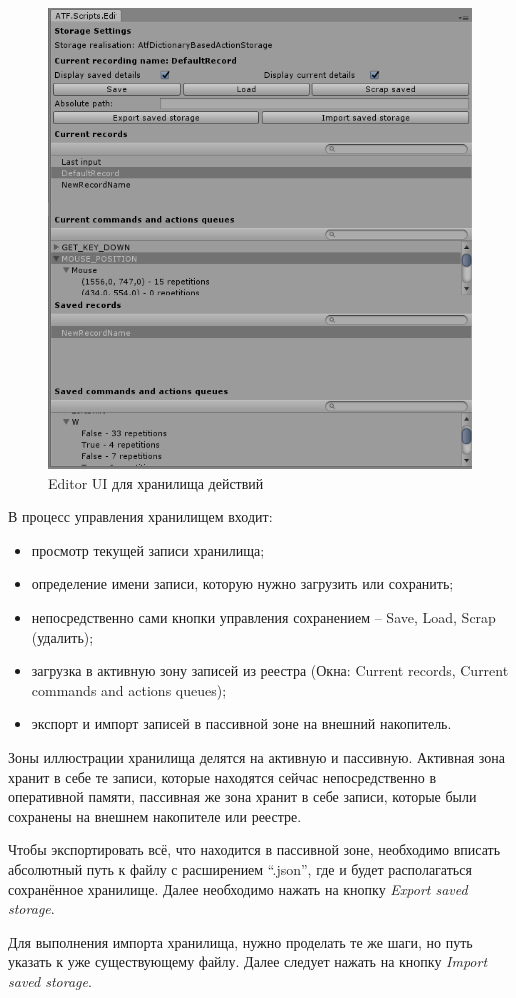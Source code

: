 \begin{figure}[h]
	\centering
	\includegraphics[width=0.7\linewidth]{storage.PNG}
	\caption{Editor UI для хранилища действий}
	\label{storageUI}
\end{figure}

В процесс управления хранилищем входит:
\begin{itemize}
	\item
	просмотр текущей записи хранилища;
	\item
	определение имени записи, которую нужно загрузить или сохранить; 
	\item
	непосредственно сами кнопки управления сохранением -- Save, Load, Scrap (удалить);
	\item
	загрузка в активную зону записей из реестра (Окна: Current records, Current commands and actions queues);
	\item экспорт и импорт записей в пассивной зоне на внешний накопитель.
\end{itemize}
Зоны иллюстрации хранилища делятся на активную и пассивную. Активная зона хранит в себе те записи, которые находятся сейчас непосредственно в оперативной памяти, пассивная же зона хранит в себе записи, которые были сохранены на внешнем накопителе или реестре.

Чтобы экспортировать всё, что находится в пассивной зоне, необходимо вписать абсолютный путь к файлу с расширением ``.json'', где и будет располагаться сохранённое хранилище. Далее необходимо нажать на кнопку \textit{Export saved storage}.

Для выполнения импорта хранилища, нужно проделать те же шаги, но путь указать к уже существующему файлу. Далее следует нажать на кнопку \textit{Import saved storage}. 

